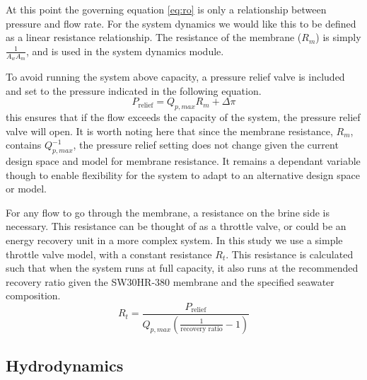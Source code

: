 \documentclass[twocolumn,10pt]{asme2e}
\begin{document}
At this point the governing equation \ref{eq:ro} is only a relationship between pressure and flow rate. For the system dynamics we would like this to be defined as a linear resistance relationship. The resistance of the membrane ($R_m$) is simply $\frac{1}{A_w A_m}$, and is used in the system dynamics module.

To avoid running the system above capacity, a pressure relief valve is included and set to the pressure indicated in the following equation.
\begin{equation}
    P_{\text{relief}} = Q_{p,max}R_m + \Delta \pi
    \label{eq:pressure_relief}
\end{equation}
this ensures that if the flow exceeds the capacity of the system, the pressure relief valve will open. It is worth noting here that since the membrane resistance, $R_m$, contains $Q_{p,max}^{-1}$, the pressure relief setting does not change given the current design space and model for membrane resistance. It remains a dependant variable though to enable flexibility for the system to adapt to an alternative design space or model.

For any flow to go through the membrane, a resistance on the brine side is necessary. This resistance can be thought of as a throttle valve, or could be an energy recovery unit in a more complex system. In this study we use a simple throttle valve model, with a constant resistance $R_t$. This resistance is calculated such that when the system runs at full capacity, it also runs at the recommended recovery ratio given the SW30HR-380 membrane and the specified seawater composition.
\begin{equation}
    R_t = \frac{P_{\text{relief}}}{Q_{p,max}(\frac{1}{\text{recovery ratio}} - 1)}
\end{equation}

\subsection{Hydrodynamics}
\end{document}

